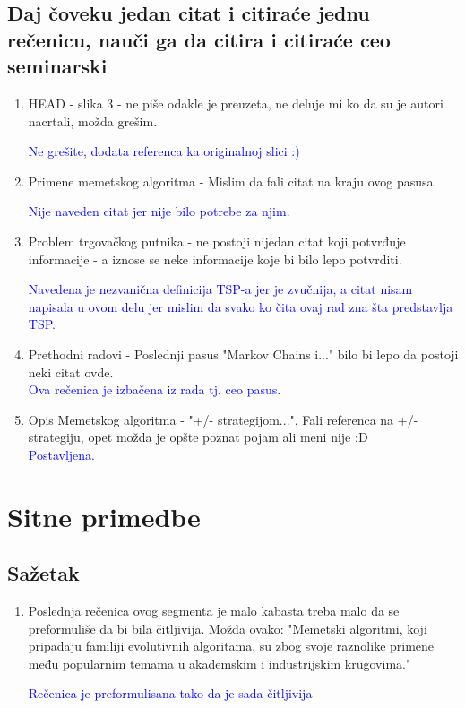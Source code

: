 \documentclass[a4paper]{report}
\newcommand{\odgovor}[1]{\textcolor{blue}{#1}}
\begin{document}
\subsection{Daj čoveku jedan citat i citiraće jednu rečenicu, nauči ga da citira i citiraće ceo seminarski}
\begin{enumerate}
  \item HEAD - slika 3 - ne piše odakle je preuzeta, ne deluje mi ko da su je autori nacrtali, možda grešim.
  
  \odgovor{Ne grešite, dodata referenca ka originalnoj slici :)}
  \item Primene memetskog algoritma - Mislim da fali citat na kraju ovog pasusa.
  
  \odgovor{Nije naveden citat jer nije bilo potrebe za njim.}
  
  \item Problem trgovačkog putnika - ne postoji nijedan citat koji potvrđuje informacije - a iznose se neke informacije koje bi bilo lepo potvrditi.
  
  \odgovor{ Navedena je nezvanična definicija TSP-a jer je zvučnija, a citat nisam napisala u ovom delu jer mislim da svako ko čita ovaj rad zna šta predstavlja TSP.}
  \item Prethodni radovi - Poslednji pasus "Markov Chains i..."  bilo bi lepo da postoji neki citat ovde. \\
    \odgovor{Ova rečenica je izbačena iz rada tj. ceo pasus.}
  
  \item Opis Memetskog algoritma - "+/- strategijom...", Fali referenca na +/- strategiju, opet možda je opšte poznat pojam ali meni nije :D \\
  \odgovor{Postavljena. \\}
  
\end{enumerate}

\section{Sitne primedbe}

\subsection{Sažetak}
\begin{enumerate}
  \item Poslednja rečenica ovog segmenta je malo kabasta treba malo da se preformuliše da bi bila čitljivija. Možda ovako: "Memetski algoritmi, koji pripadaju familiji evolutivnih algoritama, su zbog svoje raznolike primene među popularnim temama u akademskim i industrijskim krugovima."
  
  \odgovor{Rečenica je preformulisana tako da je sada čitljivija}
  
  
\end{enumerate}
\end{document}
